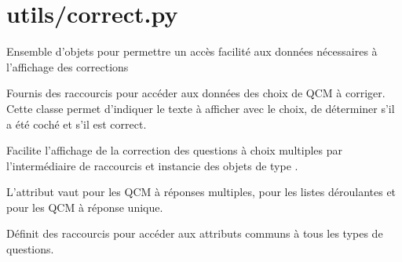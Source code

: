 \documentclass[a4,10pt,french]{sphinxmanual}
\begin{document}
\section{utils/correct.py}
\label{source:utils-correct-py}\label{source:module-quiz.utils.correct}
Ensemble d'objets pour permettre un accès facilité aux données nécessaires à
l'affichage des corrections

\begin{fulllineitems}
\label{source:quiz.utils.correct.CorrectChoice}
Fournis des raccourcis pour accéder aux données des choix de QCM à corriger.
Cette classe permet d'indiquer le texte à afficher avec le choix, de déterminer
s'il a été coché et s'il est correct.

\end{fulllineitems}


\begin{fulllineitems}
\label{source:quiz.utils.correct.CorrectQcm}
Facilite l'affichage de la correction des questions à choix multiples par
l'intermédiaire de raccourcis et instancie des objets de type {\hyperref[source:quiz.utils.correct.CorrectChoice]{\emph{}}}.

L'attribut  vaut  pour les QCM à réponses multiples,  pour
les listes déroulantes et  pour les QCM à réponse unique.

\end{fulllineitems}


\begin{fulllineitems}
\label{source:quiz.utils.correct.CorrectQuestion}
Définit des raccourcis pour accéder aux attributs communs à tous les types
de questions.

\end{fulllineitems}

\end{document}
